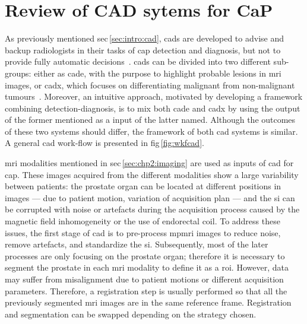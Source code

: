 \chapter{Review of CAD sytems for CaP}\label{chap:3}
\ifpdf
    \graphicspath{{3_review/figures/}}
\else
    \graphicspath{{3_review/figures/}}
\fi



As previously mentioned \acs{sec}\,\ref{sec:intro:cad}, \acp{cad} are developed to advise and backup radiologists in their tasks of \ac{cap} detection and diagnosis, but not to provide fully automatic decisions~\cite{Giger2008}.
\acp{cad} can be divided into two different sub-groups: either as \ac{cade}, with the purpose to highlight probable lesions in \ac{mri} images, or \ac{cadx}, which focuses on differentiating malignant from non-malignant tumours~\cite{Giger2008}.
Moreover, an intuitive approach, motivated by developing a framework combining detection-diagnosis, is to mix both \ac{cade} and \ac{cadx} by using the output of the former mentioned as a input of the latter named.
Although the outcomes of these two systems should differ, the framework of both \ac{cad} systems is similar.
A general \ac{cad} work-flow is presented in \acs{fig}\,\ref{fig:wkfcad}.

\ac{mri} modalities mentioned in \acs{sec}\,\ref{sec:chp2:imaging} are used as inputs of \ac{cad} for \ac{cap}.
These images acquired from the different modalities show a large variability between patients: the prostate organ can be located at different positions in images --- due to patient motion, variation of acquisition plan --- and the \ac{si} can be corrupted with noise or artefacts during the acquisition process caused by the magnetic field inhomogeneity or the use of endorectal coil.
To address these issues, the first stage of \ac{cad} is to pre-process \ac{mpmri} images to reduce noise, remove artefacts, and standardize the \ac{si}.
Subsequently, most of the later processes are only focusing on the prostate organ; therefore it is necessary to segment the prostate in each \ac{mri} modality to define it as a \ac{roi}.
However, data may suffer from misalignment due to patient motions or different acquisition parameters.
Therefore, a registration step is usually performed so that all the previously segmented \ac{mri} images are in the same reference frame.
Registration and segmentation can be swapped depending on the strategy chosen.

